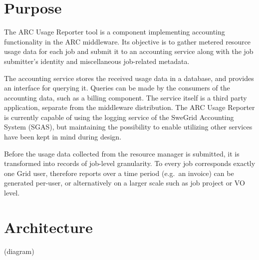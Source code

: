 \documentclass{article}                            %
\begin{document}
\newpage

\section{Purpose}

The ARC Usage Reporter tool is a component implementing accounting
functionality in the ARC middleware. Its objective is to gather
metered resource usage data for each job and submit it to an
accounting service along with the job submitter's identity and
miscellaneous job-related metadata. 

The accounting service stores the received usage data in a database,
and provides an interface for querying it.  Queries can be made by the
consumers of the accounting data, such as a billing component.  The
service itself is a third party application, separate from the
middleware distribution. The ARC Usage Reporter is currently capable
of using the logging service of the SweGrid Accounting System (SGAS),
but maintaining the possibility to enable utilizing other services
have been kept in mind during design.

Before the usage data collected from the resource manager is
submitted, it is transformed into records of job-level granularity. To
every job corresponds exactly one Grid user, therefore reports over a
time period (e.g.~an invoice) can be generated per-user, or
alternatively on a larger scale such as job project or VO level.

\section{Architecture}
  (diagram)

\begin{figure}[ht]
\end{figure}
\end{document}
